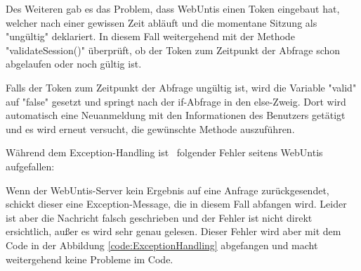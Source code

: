 Des Weiteren gab es das Problem, dass WebUntis einen Token eingebaut hat, welcher nach einer gewissen Zeit abläuft und die momentane Sitzung als "ungültig" deklariert. In diesem Fall weitergehend mit der Methode "validateSession()" überprüft, ob der Token zum Zeitpunkt der Abfrage schon abgelaufen oder noch gültig ist. 



Falls der Token zum Zeitpunkt der Abfrage ungültig ist, wird die Variable "valid" auf "false" gesetzt und springt nach der if-Abfrage in den else-Zweig. Dort wird automatisch eine Neuanmeldung mit den Informationen des Benutzers getätigt und es wird erneut versucht, die gewünschte Methode auszuführen.

\pagebreak

Während dem Exception-Handling ist \ZELIA\ folgender Fehler seitens WebUntis aufgefallen:


Wenn der WebUntis-Server kein Ergebnis auf eine Anfrage zurückgesendet, schickt dieser eine Exception-Message, die in diesem Fall abfangen wird. Leider ist aber die Nachricht falsch geschrieben und der Fehler ist nicht direkt ersichtlich, außer es wird sehr genau gelesen. Dieser Fehler wird aber mit dem Code in der Abbildung \ref{code:ExceptionHandling} abgefangen und macht weitergehend keine Probleme im Code.